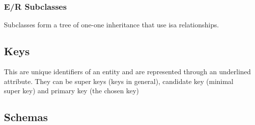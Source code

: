 \documentclass[12pt, a4paper]{article}
\begin{document}
\subsubsection*{E/R Subclasses}
Subclasses form a tree of one-one inheritance that use isa relationships. 

\subsection{Keys}
This are unique identifiers of an entity and are represented through an underlined attribute. They can
be super keys (keys in general), candidate key (minimal super key) and primary key (the chosen key)

\subsection{Schemas}
\end{document}

